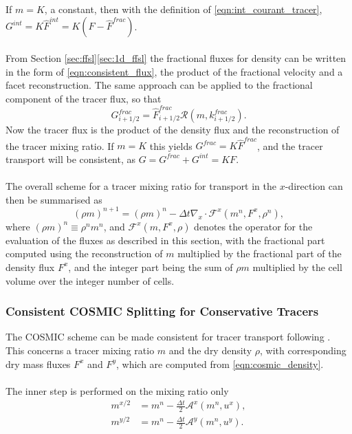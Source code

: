 \documentclass{ametsocV6.1}
\begin{document}
If $m=K$, a constant, then with the definition of \eqref{eqn:int_courant_tracer}, $G^{int}=K\widehat{F}^{int}=K(F - \widehat{F}^{frac})$. \\
\\
From Section \ref{sec:ffsl}\ref{sec:1d_ffsl} the fractional fluxes for density can be written in the form of \eqref{eqn:consistent_flux}, the product of the fractional velocity and a facet reconstruction.
The same approach can be applied to the fractional component of the tracer flux, so that
\begin{equation}
G_{i+1/2}^{frac} = \widehat{F}_{i+1/2}^{frac} \mathcal{R}(m,k_{i+1/2}^{frac}).
\end{equation}
Now the tracer flux is the product of the density flux and the reconstruction of the tracer mixing ratio.
If $m=K$ this yields $G^{frac}=K\widehat{F}^{frac}$, and the tracer transport will be consistent, as $G=G^{frac}+G^{int}=KF$. \\
\\
The overall scheme for a tracer mixing ratio for transport in the $x$-direction can then be summarised as
\begin{equation} \label{eqn:1D_density}
(\rho m)^{n+1} = (\rho m)^n - \Delta t \nabla_x\cdot \mathcal{F}^x(m^n,F^x,\rho^n),
\end{equation}
where $(\rho m)^n\equiv \rho^n m^n$, and $\mathcal{F}^x(m,F^x,\rho)$ denotes the operator for the evaluation of the fluxes as described in this section, with the fractional part computed using the reconstruction of $m$ multiplied by the fractional part of the density flux $F^x$, and the integer part being the sum of $\rho m$ multiplied by the cell volume over the integer number of cells.

\subsubsection{Consistent COSMIC Splitting for Conservative Tracers} \label{sec:cosmic_tracer}
The COSMIC scheme can be made consistent for tracer transport following \cite{lin1996ffsl}.
This concerns a tracer mixing ratio $m$ and the dry density $\rho$, with corresponding dry mass fluxes $F^x$ and $F^y$, which are computed from \eqref{eqn:cosmic_density}. \\ 
\\
The inner step is performed on the mixing ratio only
\begin{subequations}
\begin{align}
    m^{x/2} &= m^n - \frac{\Delta{t}}{2} \mathcal{A}^x(m^n, u^x), \\
    m^{y/2} &= m^n - \frac{\Delta{t}}{2} \mathcal{A}^y(m^n, u^y).
\end{align}
\end{subequations}
\end{document}
